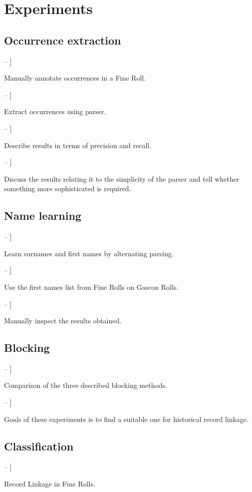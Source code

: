 \documentclass[11pt]{article}
\newcommand{\MyCheckedBox}{\makebox[0pt][l]{$\square$}\raisebox{.15ex}{\hspace{0.1em}$\checkmark$}}
\newcommand{\MyCheckBox}{\makebox[0pt][l]{$\square$}\raisebox{.15ex}}
\let\oldmarginpar\marginpar
\renewcommand\marginpar[1]{\-\oldmarginpar[\raggedleft #1]%
{\raggedright #1}}
\newenvironment{checklist}{%
  \begin{list}{}{}%
  \let\olditem\item
  \renewcommand\item{\olditem -- \marginpar{\MyCheckBox} }
  \newcommand\checkeditem{\olditem -- \marginpar{\MyCheckedBox} }
}{%
  \end{list}
}
\begin{document}
\section{Experiments}

\subsection{Occurrence extraction}
\begin{checklist}
    \item Manually annotate occurrences in a Fine Roll.
    \item Extract occurrences using parser.
    \item Describe results in terms of precision and recall.
    \item Discuss the results relating it to the simplicity of the parser and tell whether something more sophisticated is required.
\end{checklist}

\subsection{Name learning}
\begin{checklist}
    \item Learn surnames and first names by alternating parsing.
    \item Use the first names list from Fine Rolls on Gascon Rolls.
    \item Manually inspect the results obtained.
\end{checklist}

\subsection{Blocking}
\begin{checklist}
    \item Comparison of the three described blocking methods.
    \item Goals of these experiments is to find a suitable one for historical record linkage.
\end{checklist}

\subsection{Classification}
\begin{checklist}
    \item Record Linkage in Fine Rolls.
\end{checklist}
\end{document}
